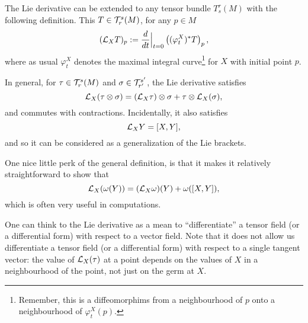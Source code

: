 \begin{remark}
  The Lie derivative can be extended to any tensor bundle $T_s^r(M)$ with the following definition.
  This $T\in\mathcal{T}_r^s(M)$, for any $p\in M$
  \begin{equation}
    (\mathcal{L}_X T)_p := \frac{d}{dt}\Big|_{t=0}\left((\varphi_t^X)^* T\right)_p,
  \end{equation}
  where as usual $\varphi_t^X$ denotes the maximal integral curve\footnote{Remember, this is a diffeomorphims from a neighbourhood of $p$ onto a neighbourhood of $\varphi_t^X(p)$.} for $X$ with initial point $p$.

  In general, for $\tau\in\mathcal{T}_r^s(M)$ and $\sigma\in\mathcal{T}_{r'}^{s'}$, the Lie derivative satisfies
  \begin{equation}
    \mathcal{L}_X(\tau\otimes\sigma) = (\mathcal{L}_X\tau)\otimes\sigma + \tau\otimes\mathcal{L}_X(\sigma),
  \end{equation}
  and commutes with contractions.
  Incidentally, it also satisfies
  \begin{equation}
    \mathcal{L}_XY = [X,Y],
  \end{equation}
  and so it can be considered as a generalization of the Lie brackets.

  One nice little perk of the general definition, is that it makes it relatively straightforward to show that
  \begin{equation}\label{eq:cLXwBrackets}
    \mathcal{L}_X(\omega(Y)) = (\mathcal{L}_X\omega)(Y) + \omega([X,Y]),
  \end{equation}
  which is often very useful in computations.

  One can think to the Lie derivative as a mean to ``differentiate'' a tensor field (or a differential form) with respect to a vector field.
  Note that it does not allow us differentiate a tensor field (or a differential form) with respect to a single tangent vector: the value of $\mathcal{L}_X(\tau)$ at a point depends on the values of $X$ in a neighbourhood of the point, not just on the germ at $X$.
\end{remark}

